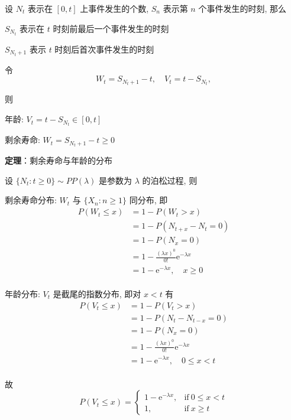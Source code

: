 \documentclass[openany]{ctexbook}
\theoremstyle{kaiti}
\theoremstyle{normal}
\begin{document}
  设 $N_t$ 表示在 $[0,t]$ 上事件发生的个数, $S_n$ 表示第 $n$ 个事件发生的时刻, 那么

 $S_{N_t}$ 表示在 $t$ 时刻前最后一个事件发生的时刻

 $S_{N_t+1}$ 表示 $t$ 时刻后首次事件发生的时刻
  
  令
\begin{equation}
    W_t=S_{N_t+1}-t,\quad V_t=t-S_{N_t},
\end{equation}
  
  则

 年龄: $V_t=t-S_{N_t}\in[0,t]$

 剩余寿命: $W_t=S_{N_t+1}-t\geqslant0$
  
\textbf{定理}：剩余寿命与年龄的分布
  
  设 $\{N_t:t\geqslant0\}\sim PP(\lambda)$ 是参数为 $\lambda$ 的泊松过程, 则

 剩余寿命分布: $W_t$ 与 $\{X_n:n\geqslant1\}$ 同分布, 即
\begin{equation}
    \begin{aligned}
      P(W_t\leqslant x)
      &=1-P(W_t>x)\\
      &=1-P(N_{t+x}-N_t=0)\\
      &=1-P(N_x=0)\\
      &=1-\frac{(\lambda x)^0}{0!}\mathrm{e}^{-\lambda x}\\
      &=1-\mathrm{e}^{-\lambda x},\quad x\geqslant0\\
    \end{aligned}
\end{equation}
  

 年龄分布: $V_t$ 是截尾的指数分布, 即对 $x < t$ 有
\begin{equation}
    \begin{aligned}
      P(V_t\leqslant x)
      &=1-P(V_t>x)\\
      &=1-P(N_t-N_{t-x}=0)\\
      &=1-P(N_x=0)\\
      &=1-\frac{(\lambda x)^0}{0!}\mathrm{e}^{-\lambda x}\\
      &=1-\mathrm{e}^{-\lambda x}, \quad 0 \leqslant x < t\\
    \end{aligned}  
\end{equation}
  
  故
\begin{equation}
    P(V_t\leqslant x)=
    \begin{cases}
      1-\mathrm{e}^{-\lambda x}, &\text{if}~ 0 \leqslant x < t\\
      1, & \text{if}~x\geqslant t
    \end{cases}
\end{equation}
  
\end{document}
